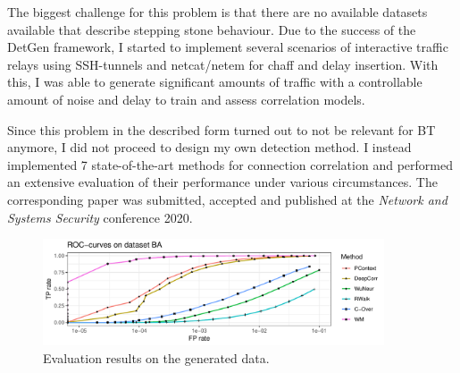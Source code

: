 \documentclass[a4paper,12pt,twoside]{article}
\begin{document}
The biggest challenge for this problem is that there are no available datasets available that describe stepping stone behaviour. Due to the success of the  DetGen framework, I started to implement several scenarios of interactive traffic relays using SSH-tunnels and netcat/netem for chaff and delay insertion. With this, I was able to generate significant amounts of traffic with a controllable amount of noise and delay to train and assess correlation models.

Since this problem in the described form turned out to not be relevant for BT anymore, I did not proceed to design my own detection method. 
I instead implemented 7 state-of-the-art methods for connection correlation and performed an extensive evaluation of their performance under various circumstances. The corresponding paper was submitted, accepted and published at the \textit{Network and Systems Security} conference 2020.


\begin{figure}
\centering
\includegraphics[width=0.9\textwidth]{images/Noevasion_4nodes-1.pdf}
\caption{Evaluation results on the generated data.}\label{stepstone}
\end{figure}


\end{document}
